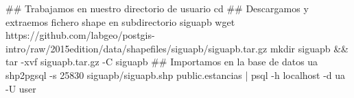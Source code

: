 \lstset{caption=Importación de estancias,label=bash:importarEstancias}
\begin{bash}
## Trabajamos en nuestro directorio de usuario
cd
## Descargamos y extraemos fichero shape en subdirectorio siguapb
wget https://github.com/labgeo/postgis-intro/raw/2015edition/data/shapefiles/siguapb/siguapb.tar.gz
mkdir siguapb && tar -xvf siguapb.tar.gz -C siguapb
## Importamos en la base de datos ua
shp2pgsql -s 25830 siguapb/siguapb.shp public.estancias  | psql -h localhost -d ua -U user
\end{bash}
